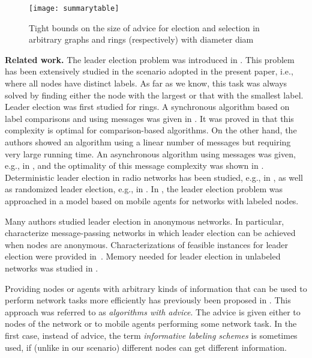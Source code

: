 \documentclass[11pt]{article}
\begin{document}
\begin{figure}[!ht]
\begin{center}
\texttt{[image: summarytable]}
\end{center}
\caption{Tight bounds on the size of advice for election and selection in arbitrary graphs and rings (respectively) with diameter diam }
\label{summarytable}
\end{figure}












\noindent
{\bf Related work.}
The leader election problem was introduced in \cite{LL}. This problem  has been extensively studied in the scenario adopted in the present paper, i.e.,
where all nodes have distinct labels. As far as we know, this task was always solved by finding either the node with the largest or that with the smallest label.
Leader election was first studied for rings.
A synchronous algorithm based on label comparisons and using
 messages was given in \cite{HS}. It was proved in \cite{FL} that
this complexity is optimal for comparison-based algorithms. On the other hand, the authors showed
an algorithm using a linear number of messages but requiring very large running time.
An asynchronous algorithm using  messages was given, e.g., in \cite{P}, and
the optimality of this message complexity was shown in \cite{B}. Deterministic leader election in radio networks has been studied, e.g., 
in \cite{JKZ,KP,NO}, as well as randomized leader election, e.g., in \cite{Wil}. In \cite{HKMMJ}, the leader election problem was
approached in a model based on mobile agents for networks with labeled nodes.

Many authors \cite{An,AtSn,ASW,BV,YK2,YK3} studied leader election
in anonymous networks. In particular, \cite{BSVCGS,YK3} characterize message-passing networks in which
leader election can be achieved when nodes are anonymous.
Characterizations of feasible instances for leader election were provided in~\cite{C,CM}.
Memory needed for leader election in unlabeled networks was studied in \cite{FP}. 







Providing nodes or agents with arbitrary kinds of information that can be used to perform network tasks more efficiently has previously been
proposed in \cite{AKM01,CFP,DP,EFKR,FGIP,FIP1,FIP2,FKL,FP,FPR,GPPR02,IKP,KKKP02,KKP05,SN,TZ05}. This approach was referred to as
{\em algorithms with advice}.  
The advice is given either to nodes of the network or to mobile agents performing some network task.
In the first case, instead of advice, the term {\em informative labeling schemes} is sometimes used, if (unlike in our scenario) different nodes can get different information.
\end{document}
